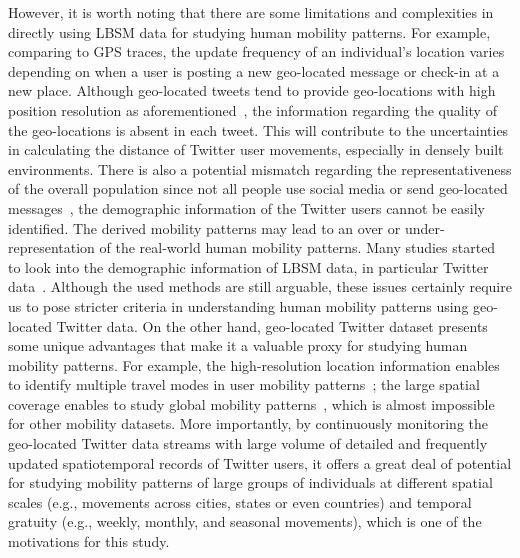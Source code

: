 \documentclass[ijgi,article,accept,moreauthors,pdftex,10pt,a4paper]{mdpi}
\theoremstyle{mdpi}
\newcounter{ex}
\newcounter{re}
\theoremstyle{mdpidefinition}
\begin{document}
However, it is worth noting that there are some limitations and complexities in directly using LBSM data for studying human mobility patterns.
For example, comparing to GPS traces, the update frequency of an individual's location varies depending on when a user is posting a new geo-located message or check-in at a new place.
Although geo-located tweets tend to provide geo-locations with high position resolution as aforementioned~\cite{Jurdak2015}, the information regarding the quality of the geo-locations is absent in each tweet.
This will contribute to the uncertainties in calculating the distance of Twitter user movements, especially in densely built environments.   
There is also a potential mismatch regarding the representativeness of the overall population since not all people use social media or send geo-located messages~\cite{kung2014exploring}, the demographic information of the Twitter users cannot be easily identified.
The derived mobility patterns may lead to an over or under-representation of the real-world human mobility patterns.
Many studies started to look into the demographic information of LBSM data, in particular Twitter data~\cite{mitchell2013geography,longley2015geotemporal}.
Although the used methods are still arguable, these issues certainly require us to pose stricter criteria in understanding human mobility patterns using geo-located Twitter data.
On the other hand, geo-located Twitter dataset presents some unique advantages that make it a valuable proxy for studying human mobility patterns.
For example, the high-resolution location information enables to identify multiple travel modes in user mobility patterns~\cite{Jurdak2015}; the large spatial coverage enables to study global mobility patterns~\cite{hawelka2014geo}, which is almost impossible for other mobility datasets.
More importantly, by continuously monitoring the geo-located Twitter data streams with large volume of detailed and frequently updated spatiotemporal records of Twitter users, it offers a great deal of potential for studying mobility patterns of large groups of individuals at different spatial scales (e.g., movements across cities, states or even countries) and temporal gratuity (e.g., weekly, monthly, and seasonal movements), which is one of the motivations for this study.
\end{document}
